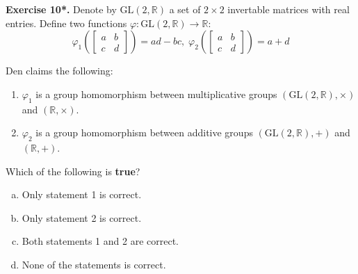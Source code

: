 \documentclass[../lecture-notes.tex]{subfiles}
\begin{document}
\newpage

\textbf{Exercise 10*.} Denote by $\text{GL}(2,\mathbb{R})$ a set of $2\times 2$ invertable matrices with real entries. Define two functions $\varphi: \text{GL}(2,\mathbb{R}) \to \mathbb{R}$:
\begin{equation*}
    \varphi_1 \left(\begin{bmatrix}
        a & b \\ c & d
    \end{bmatrix}\right) = ad - bc, \; \varphi_2 \left(\begin{bmatrix}
        a & b \\ c & d
    \end{bmatrix}\right) = a + d
\end{equation*}

Den claims the following:
\begin{enumerate}
    \item $\varphi_1$ is a group homomorphism between multiplicative groups $(\text{GL}(2,\mathbb{R}), \times)$ and $(\mathbb{R}, \times)$.
    \item $\varphi_2$ is a group homomorphism between additive groups $(\text{GL}(2, \mathbb{R}), +)$ and $(\mathbb{R}, +)$.
\end{enumerate}

Which of the following is \textbf{true}?

\begin{enumerate}[a)]
    \item Only statement 1 is correct.
    \item Only statement 2 is correct.
    \item Both statements 1 and 2 are correct.
    \item None of the statements is correct.
\end{enumerate}
\end{document}
